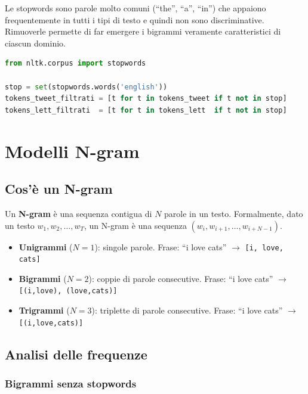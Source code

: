 \documentclass[12pt, a4paper]{article}
\begin{document}
Le stopwords sono parole molto comuni (``the'', ``a'', ``in'') che appaiono
frequentemente in tutti i tipi di testo e quindi non sono discriminative.
Rimuoverle permette di far emergere i bigrammi veramente caratteristici
di ciascun dominio.

\begin{lstlisting}[language=Python, caption=Rimozione stopwords]
from nltk.corpus import stopwords

stop = set(stopwords.words('english'))
tokens_tweet_filtrati = [t for t in tokens_tweet if t not in stop]
tokens_lett_filtrati  = [t for t in tokens_lett  if t not in stop]
\end{lstlisting}

\section{Modelli N-gram}

\subsection{Cos'è un N-gram}

Un \textbf{N-gram} è una sequenza contigua di $N$ parole in un testo.
Formalmente, dato un testo $w_1, w_2, \ldots, w_T$, un N-gram è una
sequenza $(w_i, w_{i+1}, \ldots, w_{i+N-1})$.

\begin{itemize}
    \item \textbf{Unigrammi} ($N=1$): singole parole.
          Frase: ``i love cats'' $\rightarrow$ \texttt{[i, love, cats]}
    \item \textbf{Bigrammi} ($N=2$): coppie di parole consecutive.
          Frase: ``i love cats'' $\rightarrow$ \texttt{[(i,love), (love,cats)]}
    \item \textbf{Trigrammi} ($N=3$): triplette di parole consecutive.
          Frase: ``i love cats'' $\rightarrow$ \texttt{[(i,love,cats)]}
\end{itemize}

\subsection{Analisi delle frequenze}

\subsubsection{Bigrammi senza stopwords}
\end{document}
